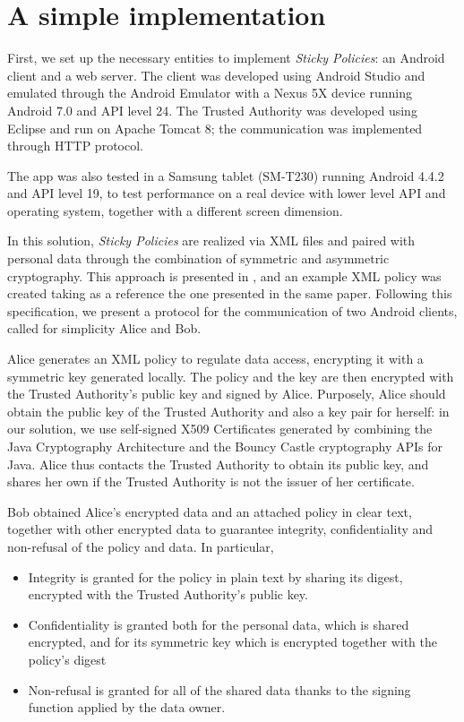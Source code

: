 \chapter{A simple implementation}
\label{chapter3}
\thispagestyle{empty}

\noindent First, we set up the necessary entities to implement \textit{Sticky Policies}: an Android client and a web server. The client was developed using Android Studio and emulated through the Android Emulator with a Nexus 5X device running Android 7.0 and API level 24. The Trusted Authority was developed using Eclipse and run on Apache Tomcat 8; the communication was implemented through HTTP protocol.

The app was also tested in a Samsung tablet (SM-T230) running Android 4.4.2 and API level 19, to test performance on a real device with lower level API and operating system, together with a different screen dimension.

In this solution, \textit{Sticky Policies} are realized via XML files and paired with personal data through the combination of symmetric and asymmetric cryptography. This approach is presented in \cite{pearson2011sticky}, and an example XML policy was created taking as a reference the one presented in the same paper. Following this specification, we present a protocol for the communication of two Android clients, called for simplicity Alice and Bob. 

Alice generates an XML policy to regulate data access, encrypting it with a symmetric key generated locally. The policy and the key are then encrypted with the Trusted Authority's public key and signed by Alice. Purposely, Alice should obtain the public key of the Trusted Authority and also a key pair for herself: in our solution, we use self-signed X509 Certificates generated by combining the Java Cryptography Architecture and the Bouncy Castle cryptography APIs for Java. Alice thus contacts the Trusted Authority to obtain its public key, and shares her own if the Trusted Authority is not the issuer of her certificate.

Bob obtained Alice's encrypted data and an attached policy in clear text, together with other encrypted data to guarantee integrity, confidentiality and non-refusal of the policy and data. In particular,
\begin{itemize}
	\item Integrity is granted for the policy in plain text by sharing its digest, encrypted with the Trusted Authority's public key.
	\item Confidentiality is granted both for the personal data, which is shared encrypted, and for its symmetric key which is encrypted together with the policy's digest
	\item Non-refusal is granted for all of the shared data thanks to the signing function applied by the data owner.
\end{itemize}

